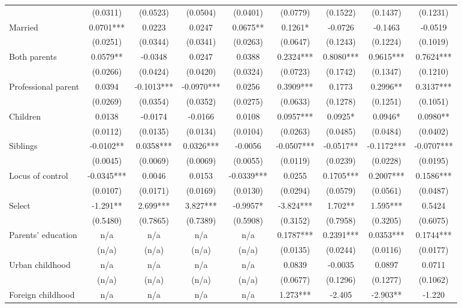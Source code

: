 \documentclass[12pt]{report}
\begin{document}
\begin{sidewaystable}
\begin{tabular}{lc|c|c|c|c|c|c|c}
& (0.0311) & (0.0523) & (0.0504) & (0.0401) & (0.0779) & (0.1522) & (0.1437) & (0.1231)\\
Married & 0.0701*** & 0.0223 & 0.0247 & 0.0675** & 0.1261* & -0.0726 & -0.1463 & -0.0519\\
& (0.0251) & (0.0344) & (0.0341) & (0.0263) & (0.0647) & (0.1243) & (0.1224) & (0.1019)\\
Both parents & 0.0579** & -0.0348 & 0.0247 & 0.0388 & 0.2324*** & 0.8080*** & 0.9615*** & 0.7624***\\
& (0.0266) & (0.0424) & (0.0420) & (0.0324) & (0.0723) & (0.1742) & (0.1347) & (0.1210)\\
Professional parent & 0.0394 & -0.1013*** & -0.0970*** & 0.0256 & 0.3909*** & 0.1773 & 0.2996** & 0.3137***\\
& (0.0269) & (0.0354) & (0.0352) & (0.0275) & (0.0633) & (0.1278) & (0.1251) & (0.1051)\\
Children & 0.0138 & -0.0174 & -0.0166 & 0.0108 & 0.0957*** & 0.0925* & 0.0946* & 0.0980**\\
& (0.0112) & (0.0135) & (0.0134) & (0.0104) & (0.0263) & (0.0485) & (0.0484) & (0.0402)\\
Siblings & -0.0102** & 0.0358*** & 0.0326*** & -0.0056 & -0.0507*** & -0.0517** & -0.1172*** & -0.0707***\\
& (0.0045) & (0.0069) & (0.0069) & (0.0055) & (0.0119) & (0.0239) & (0.0228) & (0.0195)\\
Locus of control & -0.0345*** & 0.0046 & 0.0153 & -0.0339*** & 0.0255 & 0.1705*** & 0.2007*** & 0.1586***\\
& (0.0107) & (0.0171) & (0.0169) & (0.0130) & (0.0294) & (0.0579) & (0.0561) & (0.0487)\\
Select & -1.291** & 2.699*** & 3.827*** & -0.9957* & -3.824*** & 1.702** & 1.595*** & 0.5424\\
& (0.5480) & (0.7865) & (0.7389) & (0.5908) & (0.3152) & (0.7958) & (0.3205) & (0.6075)\\
Parents' education & n/a & n/a & n/a & n/a & 0.1787*** & 0.2391*** & 0.0353*** & 0.1744***\\
& (n/a) & (n/a) & (n/a) & (n/a) & (0.0135) & (0.0244) & (0.0116) & (0.0177)\\
Urban childhood & n/a & n/a & n/a & n/a & 0.0839 & -0.0035 & 0.0897 & 0.0711\\
& (n/a) & (n/a) & (n/a) & (n/a) & (0.0677) & (0.1296) & (0.1277) & (0.1062)\\
Foreign childhood & n/a & n/a & n/a & n/a & 1.273*** & -2.405 & -2.903** & -1.220\\

\end{tabular}
\end{sidewaystable}
\end{document}
